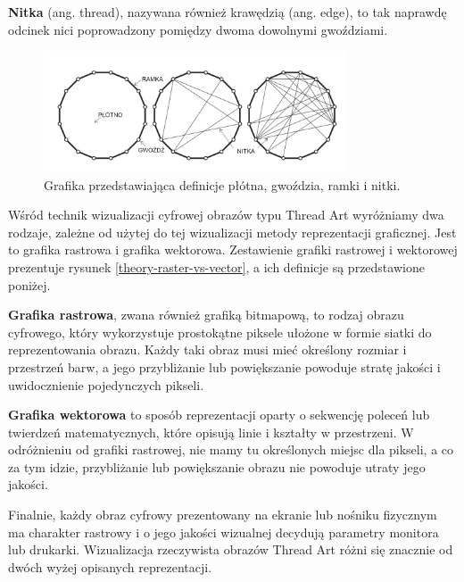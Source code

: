     \textbf{Nitka} (ang. thread), nazywana również krawędzią (ang. edge), to tak naprawdę odcinek nici poprowadzony pomiędzy dwoma dowolnymi gwoździami.
    
    \begin{figure}[htb]
        \centering
        \includegraphics[width=0.8\textwidth]{img/2-theory/cztery-pojecia.png}
        \caption[Grafika przedstawiająca płótno, gwoździe, ramkę i nitki.]{Grafika przedstawiająca definicje płótna, gwoździa, ramki i nitki.}
        \label{theory-basic-definitions-vis}
    \end{figure}
    
    
    Wśród technik wizualizacji cyfrowej obrazów typu Thread Art wyróżniamy dwa rodzaje, zależne od użytej do tej wizualizacji metody reprezentacji graficznej. Jest to grafika rastrowa i grafika wektorowa. Zestawienie grafiki rastrowej i wektorowej prezentuje rysunek \ref{theory-raster-vs-vector}, a ich definicje są przedstawione poniżej. 
   
    \textbf{Grafika rastrowa}, zwana również grafiką bitmapową, to rodzaj obrazu cyfrowego, który wykorzystuje prostokątne piksele ułożone w formie siatki do reprezentowania obrazu. Każdy taki obraz musi mieć określony rozmiar i przestrzeń barw, a jego przybliżanie lub powiększanie powoduje stratę jakości i uwidocznienie pojedynczych pikseli. 
    
    \textbf{Grafika wektorowa} to sposób reprezentacji oparty o sekwencję poleceń lub twierdzeń matematycznych, które opisują linie i kształty w przestrzeni. W odróżnieniu od grafiki rastrowej, nie mamy tu określonych miejsc dla pikseli, a co za tym idzie, przybliżanie lub powiększanie obrazu nie powoduje utraty jego jakości.
    
    Finalnie, każdy obraz cyfrowy prezentowany na ekranie lub nośniku fizycznym ma charakter rastrowy i o jego jakości wizualnej decydują parametry monitora lub drukarki. Wizualizacja rzeczywista obrazów Thread Art różni się znacznie od dwóch wyżej opisanych reprezentacji.
    
